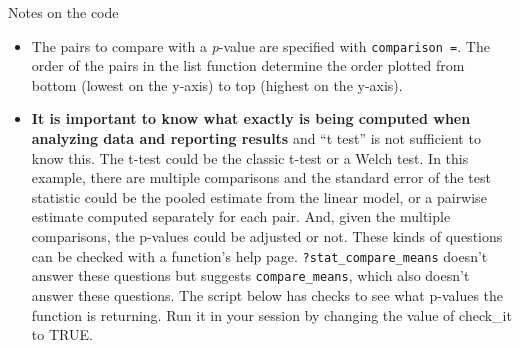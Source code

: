 \documentclass[]{book}
\newenvironment{Shaded}{\begin{snugshade}}{\end{snugshade}}
\newcommand{\CommentTok}[1]{\textcolor[rgb]{0.56,0.35,0.01}{\textit{#1}}}
\newcommand{\ControlFlowTok}[1]{\textcolor[rgb]{0.13,0.29,0.53}{\textbf{#1}}}
\newcommand{\DataTypeTok}[1]{\textcolor[rgb]{0.13,0.29,0.53}{#1}}
\newcommand{\DecValTok}[1]{\textcolor[rgb]{0.00,0.00,0.81}{#1}}
\newcommand{\KeywordTok}[1]{\textcolor[rgb]{0.13,0.29,0.53}{\textbf{#1}}}
\newcommand{\NormalTok}[1]{#1}
\newcommand{\OperatorTok}[1]{\textcolor[rgb]{0.81,0.36,0.00}{\textbf{#1}}}
\newcommand{\OtherTok}[1]{\textcolor[rgb]{0.56,0.35,0.01}{#1}}
\newcommand{\StringTok}[1]{\textcolor[rgb]{0.31,0.60,0.02}{#1}}
\begin{document}
Notes on the code

\begin{itemize}
\item
  The pairs to compare with a \emph{p}-value are specified with \texttt{comparison\ =}. The order of the pairs in the list function determine the order plotted from bottom (lowest on the y-axis) to top (highest on the y-axis).
\item
  \textbf{It is important to know what exactly is being computed when analyzing data and reporting results} and ``t test'' is not sufficient to know this. The t-test could be the classic t-test or a Welch test. In this example, there are multiple comparisons and the standard error of the test statistic could be the pooled estimate from the linear model, or a pairwise estimate computed separately for each pair. And, given the multiple comparisons, the p-values could be adjusted or not. These kinds of questions can be checked with a function's help page. \texttt{?stat\_compare\_means} doesn't answer these questions but suggests \texttt{compare\_means}, which also doesn't answer these questions. The script below has checks to see what p-values the function is returning. Run it in your session by changing the value of check\_it to TRUE.
\end{itemize}

\begin{Shaded}
\end{Shaded}
\end{document}
